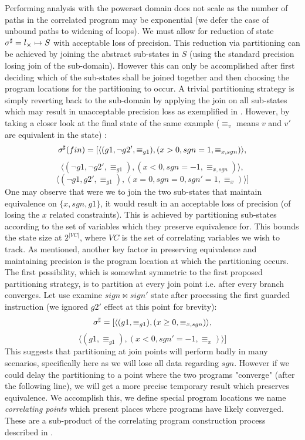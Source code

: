 Performing analysis with the powerset domain does not scale as the number of paths in the correlated program may be exponential (we defer the case of unbound paths to widening of loops). We must allow for reduction of state $\sigma^\sharp = l_{\times} \mapsto S$ with acceptable loss of precision. This reduction via partitioning can be achieved by joining the abstract sub-states in $S$ (using the standard precision losing join of the sub-domain). However this can only be accomplished after first deciding which of the sub-states shall be joined together and then choosing the program locations for the partitioning to occur. A trivial partitioning strategy is simply reverting back to the sub-domain by applying the join on all sub-states which may result in unacceptable precision loss as exemplified in . However, by taking a closer look at the final state of the same example ($\equiv_{v}$ means $v$ and $v'$ are equivalent in the state) :
\[
\sigma^\sharp(fin) = [ \langle (g1,\neg g2',\equiv_{g1}),(x>0,sgn=1,\equiv_{x,sgn}) \rangle,
\]
\[
\langle (\neg g1,\neg g2',\equiv_{g1}), (x<0,sgn=-1,\equiv_{x,sgn}) \rangle,
\]
\[
\langle (\neg g1,g2',\equiv_{g1}),(x=0,sgn=0,sgn'=1,\equiv_{x}) \rangle ]
\]
One may observe that were we to join the two sub-states that maintain equivalence on $\{x,sgn,g1\}$, it would result in an acceptable loss of precision (of losing the $x$ related constraints). This is achieved by partitioning sub-states according to the set of variables which they preserve equivalence for. This bounds the state size at $2^{|VC|}$, where $VC$ is the set of correlating variables we wish to track.
As mentioned, another key factor in preserving equivalence and maintaining precision is the program location at which the partitioning occurs. The first possibility, which is somewhat symmetric to the first proposed partitioning strategy, is to partition at every join point i.e. after every branch converges. Let use examine $sign \bowtie sign'$ state after processing the first guarded instruction  (we ignored $g2'$ effect at this point for brevity):
\[
\sigma^\sharp = [ \langle (g1,\equiv_{g1}),(x \geq 0,\equiv_{x,sgn}) \rangle,
\]
\[
\langle (g1,\equiv_{g1}),(x < 0,sgn' = -1, \equiv_{x}) \rangle ]
\]
This suggests that partitioning at join points will perform badly in many scenarios, specifically here as we will lose all data regarding $sgn$. However if we could delay the partitioning to a point where the two programs "converge" (after the following  line), we will get a more precise temporary result which preserves equivalence. We accomplish this, we define special program locations we name \emph{correlating points} which present places where programs have likely converged. These are a sub-product of the correlating program construction process described in .

